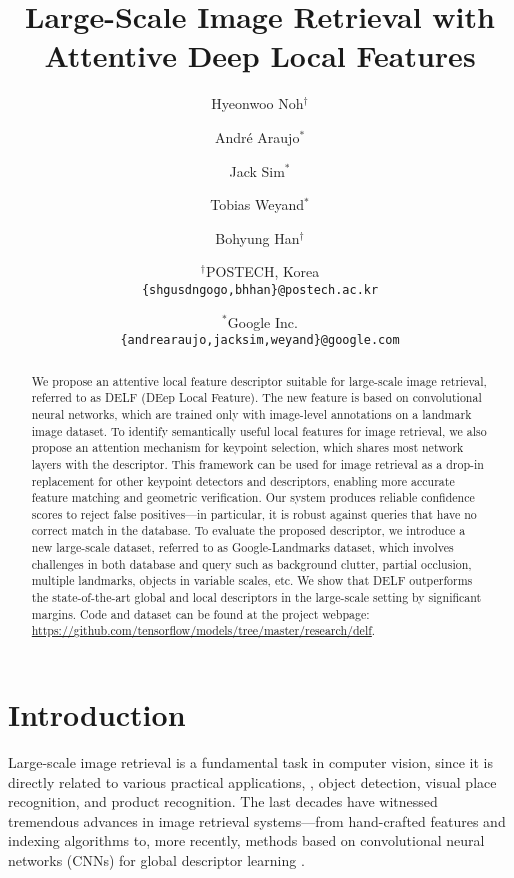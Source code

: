 \documentclass[10pt,twocolumn,letterpaper]{article}
\begin{document}
\title{Large-Scale Image Retrieval with Attentive Deep Local Features}

\author{Hyeonwoo Noh$^\dagger$ \and Andr\'{e} Araujo$^\ast$ \and Jack Sim$^\ast$ \and Tobias Weyand$^\ast$ \and Bohyung Han$^\dagger$ \and 
$^\dagger$POSTECH, Korea\\
{\tt\small \{shgusdngogo,bhhan\}@postech.ac.kr}
\and
$^\ast$Google Inc.\\
{\tt\small \{andrearaujo,jacksim,weyand\}@google.com}
}

\maketitle
\thispagestyle{empty}



\begin{abstract}

We propose an attentive local feature descriptor suitable for large-scale image retrieval, referred to as DELF (DEep Local Feature).
The new feature is based on convolutional neural networks, which are trained only with image-level annotations on a landmark image dataset.
To identify semantically useful local features for image retrieval, we also propose an attention mechanism for keypoint selection, which shares most network layers with the descriptor.
This framework can be used for image retrieval as a drop-in replacement for other keypoint detectors and descriptors, enabling more accurate feature matching and geometric verification.
Our system produces reliable confidence scores to reject false positives---in particular, it is robust against queries that have no correct match in the database.
To evaluate the proposed descriptor, we introduce a new large-scale dataset, referred to as Google-Landmarks dataset, which involves challenges in both database and query such as background clutter, partial occlusion, multiple landmarks, objects in variable scales, etc.
We show that DELF outperforms the state-of-the-art global and local descriptors in the large-scale setting by significant margins.
Code and dataset can be found at the project webpage: \url{https://github.com/tensorflow/models/tree/master/research/delf}.
\end{abstract} 




\section{Introduction} \label{sec:introduction}
Large-scale image retrieval is a fundamental task in computer vision, since it is directly related to various practical applications, \eg, object detection, visual place recognition, and product recognition.
The last decades have witnessed tremendous advances in image retrieval systems---from hand-crafted features and indexing algorithms \cite{Lowe2004,Sivic2003,Philbin07,Jegou2008} to, more recently, methods based on convolutional neural networks (CNNs) for global descriptor learning \cite{arandjelovic2015netvlad,radenovic2016cnn,gordo2016deep}.
\end{document}
